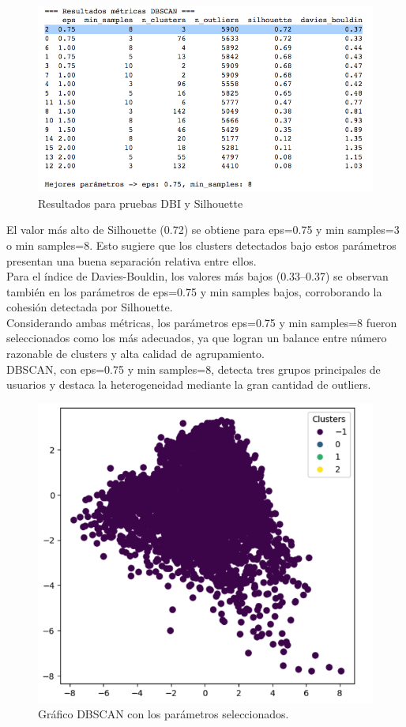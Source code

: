 \documentclass{article}
\begin{document}
\begin{figure}[H]
    \centering
    \includegraphics[width=1\linewidth]{Resultado_1.png}
    \caption{Resultados para pruebas DBI y Silhouette}
    \label{fig:resultado}
\end{figure}

El valor más alto de Silhouette (0.72) se obtiene para eps=0.75 y min samples=3 o min samples=8. Esto sugiere que los clusters detectados bajo estos parámetros presentan una buena separación relativa entre ellos.\\

Para el índice de Davies-Bouldin, los valores más bajos (0.33–0.37) se observan también en los parámetros de eps=0.75 y min samples bajos, corroborando la cohesión detectada por Silhouette.\\

Considerando ambas métricas, los parámetros eps=0.75 y min samples=8 fueron seleccionados como los más adecuados, ya que logran un balance entre número razonable de clusters y alta calidad de agrupamiento.\\

DBSCAN, con eps=0.75 y min samples=8, detecta tres grupos principales de usuarios y destaca la heterogeneidad mediante la gran cantidad de outliers.

\begin{figure}[H]
    \centering
    \includegraphics[width=0.5\linewidth]{Resultado_2.png}
    \caption{Gráfico DBSCAN con los parámetros seleccionados.}
    \label{fig:dbscan:graphic}
\end{figure}
\end{document}
